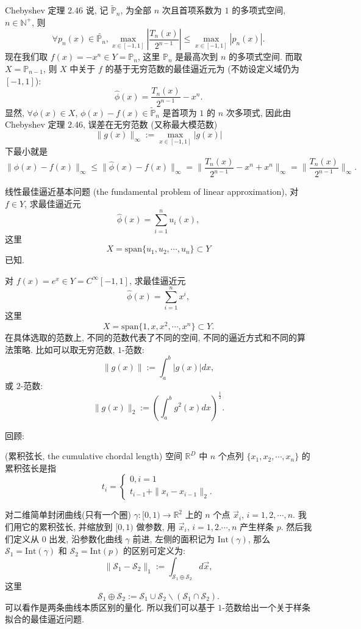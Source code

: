 \documentclass[a4paper]{ctexart}
\newcommand{\hl}[1]
{\noindent {\bf {#1}}}
\begin{document}
{\hl{例 5.2}  Chebyshev 定理 2.46 说, 记 $\tilde{{\mathbb{P}}}_n$, 为全部 $n$ 次且首项系数为 $1$ 
的多项式空间, $n \in \mathbb{N}^+$, 则
$$
\forall p_n(x) \in \tilde{\mathbb{P}_n}, 
\max_{x \in [-1, 1]}\left|\frac{T_n(x)}{2^{n - 1}}\right|
\leq \max_{x \in [-1, 1]} |p_n(x)|.
$$
现在我们取 $f(x) = -x^n \in Y = \mathbb{P}_n$, 这里 $\mathbb{P}_n$ 是最高次到 $n$ 的多项式空间.
而取 $X = \mathbb{P}_{n - 1}$, 则 $X$ 中关于 $f$ 的基于无穷范数的最佳逼近元为 
(不妨设定义域仍为 $[-1, 1]$):
$$
\hat{\phi}(x) = \frac{T_n(x)}{2^{n - 1}} - x^n.
$$
显然, $\forall \phi(x) \in X$, $\phi(x) - f(x) \in \tilde{\mathbb{P}}_{n}$ 是首项为 $1$ 的
$n$ 次多项式, 因此由 Chebyshev 定理 2.46, 误差在无穷范数 (又称最大模范数)
$$
\|g(x)\|_\infty := \max_{x \in [-1, 1]}|g(x)|
$$
下最小就是
$$
\|\phi(x) - f(x)\|_\infty \leq \|\hat{\phi}(x) - f(x)\|_\infty 
= \|\frac{T_n(x)}{2^{n - 1}} - x^n + x^n\|_\infty = \|\frac{T_n(x)}{2^{n - 1}}\|_\infty.
$$

\hl{定义 5.3} 线性最佳逼近基本问题 (the fundamental problem of linear approximation), 
对 $f \in Y$, 求最佳逼近元
$$
\hat{\phi}(x) = \sum_{i = 1}^n u_i(x), 
$$
这里
$$
X = \mbox{span}\{u_1, u_2, \cdots, u_n\} \subset Y
$$
已知.

\hl{例 5.4} 对 $f(x) = e^x \in Y = C^\infty[-1, 1]$, 
求最佳逼近元
$$
\hat{\phi}(x) = \sum_{i = 1}^n x^i, 
$$
这里
$$
X = \mbox{span}\{1, x, x^2, \cdots, x^n\} \subset Y.
$$
在具体选取的范数上, 不同的范数代表了不同的空间, 不同的逼近方式和不同的算法策略.
比如可以取无穷范数, $1$-范数:
$$
\|g(x)\| := \int_a^b |g(x)| dx,
$$
或 $2$-范数:
$$
\|g(x)\|_2 := \left(\int_a^b g^2(x) dx\right)^\frac{1}{2}.
$$

回顾:

\hl{定义 3.71} (累积弦长, the cumulative chordal length) 空间 $\mathbb{R}^D$ 中 $n$
个点列 $\{x_1, x_2, \cdots, x_n\}$ 的累积弦长是指  
$$
t_i = \left\{
\begin{array}{ll}
  0, i = 1\\
  t_{i - 1} + \|x_i - x_{i - 1}\|_2.
\end{array}
\right.
$$

\hl{例 5.5} 对二维简单封闭曲线(只有一个圈) $\gamma : [0, 1) \to \mathbb{R}^2$ 
上的 $n$ 个点 $\vec{x}_i$, $i = 1, 2, \cdots, n$. 我们用它的累积弦长, 并缩放到 $[0, 1)$ 做参数,
用 $\vec{x}_i$, $i = 1, 2. \cdots, n$ 产生样条 $p$. 然后我们定义从 $0$ 出发, 沿参数化曲线 $\gamma$ 前进, 
左侧的面积记为 $\mbox{Int}(\gamma)$, 那么 $\mathcal{S}_1 = \mbox{Int}(\gamma)$ 和 
$\mathcal{S}_2 = \mbox{Int}(p)$ 的区别可定义为: 
$$
\|\mathcal{S}_1 - \mathcal{S}_2\|_1 := \int_{\mathcal{S}_1 \oplus \mathcal{S}_2} d\vec{x},
$$
这里 
$$
\mathcal{S}_1 \oplus \mathcal{S}_2 := \mathcal{S}_1 \cup \mathcal{S}_2 \backslash (\mathcal{S}_1 \cap \mathcal{S}_2).
$$
可以看作是两条曲线本质区别的量化. 所以我们可以基于 $1$-范数给出一个关于样条拟合的最佳逼近问题.

}
\end{document}

